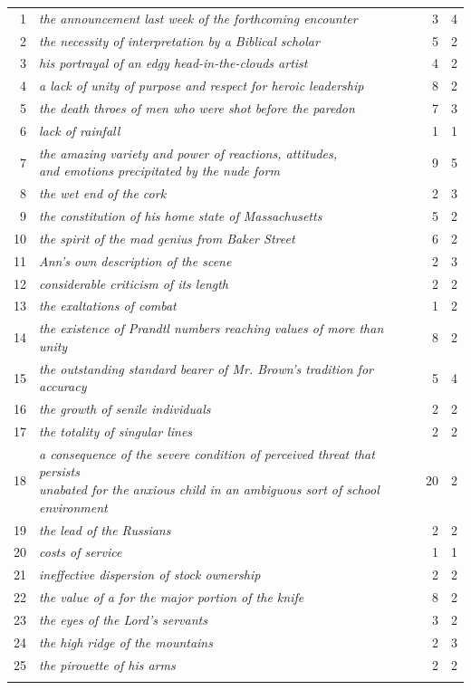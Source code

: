 \begin{table}
{\begin{tabular}[t]{rlrr}
\midrule
 1 & \textit{the announcement last week of the forthcoming encounter} & 3 & 4 \\
 2 & \textit{the necessity of interpretation by a Biblical scholar} & 5 & 2 \\
 3 & \textit{his portrayal of an edgy head\hyp{}in\hyp{}the\hyp{}clouds artist} & 4 & 2 \\
 4 & \textit{a lack of unity of purpose and respect for heroic leadership} & 8 & 2 \\
 5 & \textit{the death throes of men who were shot before the paredon} & 7 & 3 \\
 6 & \textit{lack of rainfall} & 1 & 1 \\
 7 & \makecell[lt]{\textit{the amazing variety and power of reactions, attitudes,} \\ \textit{and emotions precipitated by the nude form}} & 9 & 5 \\
 8 & \textit{the wet end of the cork} & 2 & 3 \\
 9 & \textit{the constitution of his home state of Massachusetts} & 5 & 2 \\
10 & \textit{the spirit of the mad genius from Baker Street} & 6 & 2 \\
11 & \textit{Ann's own description of the scene} & 2 & 3 \\
12 & \textit{considerable criticism of its length} & 2 & 2 \\
13 & \textit{the exaltations of combat} & 1 & 2 \\
14 & \textit{the existence of Prandtl numbers reaching values of more than unity} & 8 & 2 \\
15 & \textit{the outstanding standard bearer of Mr. Brown's tradition for accuracy} & 5 & 4 \\
16 & \textit{the growth of senile individuals} & 2 & 2 \\
17 & \textit{the totality of singular lines} & 2 & 2 \\
18 & \makecell[lt]{\textit{a consequence of the severe condition of perceived threat that persists } \\ \textit{unabated for the anxious child in an ambiguous sort of school environment}} & 20 & 2 \\
19 & \textit{the lead of the Russians} & 2 & 2 \\
20 & \textit{costs of service} & 1 & 1 \\
21 & \textit{ineffective dispersion of stock ownership} & 2 & 2 \\
22 & \textit{the value of a for the major portion of the knife} & 8 & 2 \\
23 & \textit{the eyes of the Lord's servants} & 3 & 2 \\
24 & \textit{the high ridge of the mountains} & 2 & 3 \\
25 & \textit{the pirouette of his arms} & 2 & 2 \\
\lspbottomrule
\end{tabular}}
\end{table}

